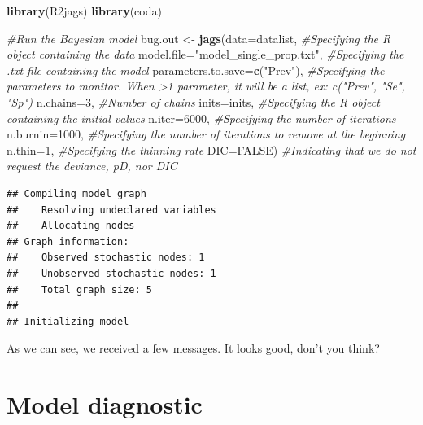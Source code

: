 \documentclass[
]{book}
\newenvironment{Shaded}{\begin{snugshade}}{\end{snugshade}}
\newcommand{\AttributeTok}[1]{\textcolor[rgb]{0.13,0.29,0.53}{#1}}
\newcommand{\CommentTok}[1]{\textcolor[rgb]{0.56,0.35,0.01}{\textit{#1}}}
\newcommand{\ConstantTok}[1]{\textcolor[rgb]{0.56,0.35,0.01}{#1}}
\newcommand{\DecValTok}[1]{\textcolor[rgb]{0.00,0.00,0.81}{#1}}
\newcommand{\FunctionTok}[1]{\textcolor[rgb]{0.13,0.29,0.53}{\textbf{#1}}}
\newcommand{\NormalTok}[1]{#1}
\newcommand{\OtherTok}[1]{\textcolor[rgb]{0.56,0.35,0.01}{#1}}
\newcommand{\StringTok}[1]{\textcolor[rgb]{0.31,0.60,0.02}{#1}}
\begin{document}
\begin{Shaded}
\begin{Highlighting}[]
\FunctionTok{library}\NormalTok{(R2jags)}
\FunctionTok{library}\NormalTok{(coda)}

\CommentTok{\#Run the Bayesian model}
\NormalTok{bug.out }\OtherTok{\textless{}{-}} \FunctionTok{jags}\NormalTok{(}\AttributeTok{data=}\NormalTok{datalist,                             }\CommentTok{\#Specifying the R object containing the data}
               \AttributeTok{model.file=}\StringTok{"model\_single\_prop.txt"}\NormalTok{,         }\CommentTok{\#Specifying the .txt file containing the model}
               \AttributeTok{parameters.to.save=}\FunctionTok{c}\NormalTok{(}\StringTok{"Prev"}\NormalTok{),               }\CommentTok{\#Specifying the parameters to monitor. When \textgreater{}1 parameter, it will be a list, ex: c("Prev", "Se", "Sp")}
               \AttributeTok{n.chains=}\DecValTok{3}\NormalTok{,                                 }\CommentTok{\#Number of chains}
               \AttributeTok{inits=}\NormalTok{inits,                                }\CommentTok{\#Specifying the R object containing the initial values  }
               \AttributeTok{n.iter=}\DecValTok{6000}\NormalTok{,                                }\CommentTok{\#Specifying the number of iterations}
               \AttributeTok{n.burnin=}\DecValTok{1000}\NormalTok{,                              }\CommentTok{\#Specifying the number of iterations to remove at the beginning}
               \AttributeTok{n.thin=}\DecValTok{1}\NormalTok{,                                   }\CommentTok{\#Specifying the thinning rate}
               \AttributeTok{DIC=}\ConstantTok{FALSE}\NormalTok{)                                  }\CommentTok{\#Indicating that we do not request the deviance, pD, nor DIC }
\end{Highlighting}
\end{Shaded}

\begin{verbatim}
## Compiling model graph
##    Resolving undeclared variables
##    Allocating nodes
## Graph information:
##    Observed stochastic nodes: 1
##    Unobserved stochastic nodes: 1
##    Total graph size: 5
## 
## Initializing model
\end{verbatim}

As we can see, we received a few messages. It looks good, don't you think?

\section{Model diagnostic}\label{model-diagnostic}
\end{document}
